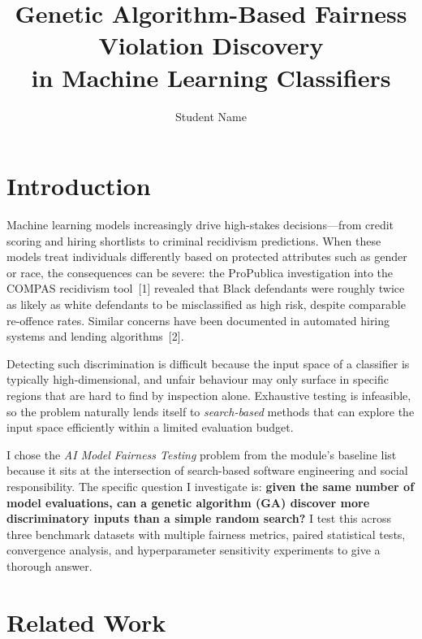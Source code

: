 \documentclass[10pt]{article}
\title{Genetic Algorithm-Based Fairness Violation Discovery\\in Machine Learning Classifiers}
\author{Student Name}
\date{}
\begin{document}
\maketitle

\section{Introduction}

Machine learning models increasingly drive high-stakes decisions---from credit scoring
and hiring shortlists to criminal recidivism predictions.  When these models treat
individuals differently based on protected attributes such as gender or race, the
consequences can be severe: the ProPublica investigation into the COMPAS recidivism
tool~[1] revealed that Black defendants were roughly twice as likely as white defendants
to be misclassified as high risk, despite comparable re-offence rates.  Similar concerns
have been documented in automated hiring systems and lending algorithms~[2].

Detecting such discrimination is difficult because the input space of a classifier is
typically high-dimensional, and unfair behaviour may only surface in specific regions
that are hard to find by inspection alone.  Exhaustive testing is infeasible, so the
problem naturally lends itself to \emph{search-based} methods that can explore the input
space efficiently within a limited evaluation budget.

I chose the \textit{AI Model Fairness Testing} problem from the module's baseline list
because it sits at the intersection of search-based software engineering and social
responsibility.  The specific question I investigate is: \textbf{given the same number of
model evaluations, can a genetic algorithm (GA) discover more discriminatory inputs than
a simple random search?}  I test this across three benchmark datasets with multiple
fairness metrics, paired statistical tests, convergence analysis, and hyperparameter
sensitivity experiments to give a thorough answer.

\section{Related Work}
\end{document}

